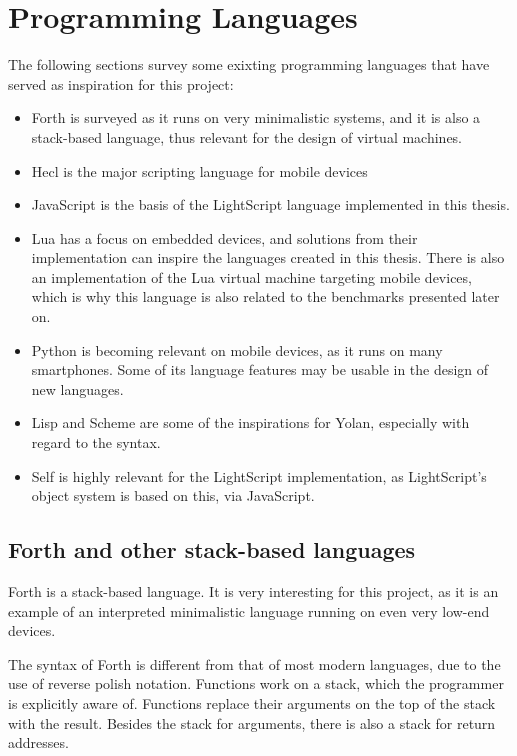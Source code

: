 \documentclass[11pt]{report}
\begin{document}
\section{Programming Languages}
\label{langsurvey}
The following sections survey some exixting programming languages that have served as inspiration for this project:
\begin{itemize}
\item Forth is surveyed as it runs on very minimalistic systems, and it is also a stack-based language, thus relevant for the design of virtual machines. 
\item Hecl is the major scripting language for mobile devices
\item JavaScript is the basis of the LightScript language implemented in this thesis.
\item Lua has a focus on embedded devices, and solutions from their implementation can inspire the languages created in this thesis. There is also an implementation of the Lua virtual machine targeting mobile devices, which is why this language is also related to the benchmarks presented later on.
\item Python is becoming relevant on mobile devices, as it runs on many smartphones. Some of its language features may be usable in the design of new languages.
\item Lisp and Scheme are some of the inspirations for Yolan, especially with regard to the syntax. 
\item Self is highly relevant for the LightScript implementation, as LightScript's object system is based on this, via JavaScript.
\end{itemize}


\subsection{Forth and other stack-based languages}
Forth is a stack-based language.
It is very interesting for this project, as it is an example of an interpreted minimalistic language running on even very low-end devices.

The syntax of Forth is different from that of most modern languages, due to the use of reverse polish notation.
Functions work on a stack, which the programmer is explicitly aware of. 
Functions replace their arguments on the top of the stack with the result. 
Besides the stack for arguments, there is also a stack for return addresses.
\end{document}
